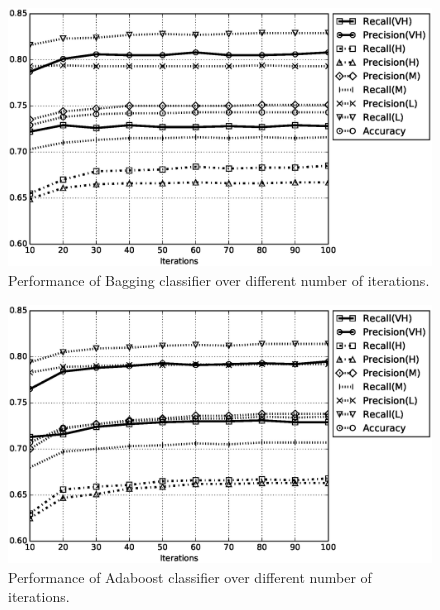 \documentclass[a4paper,10pt,onecolumn,preprint,3p]{elsarticle}
\begin{document}
\begin{figure}
\centerline{
\includegraphics[scale=0.46]{Bagging}}

\caption{Performance of Bagging classifier over different number of iterations.}
\label{fig:PerformanceBagging}
\end{figure}

\begin{figure}
\centerline{
\includegraphics[scale=0.46]{Adaboost}
}
\caption{Performance of Adaboost classifier over different number of iterations.}
\label{fig:PerformanceAdaboost}
\end{figure}
\end{document}
